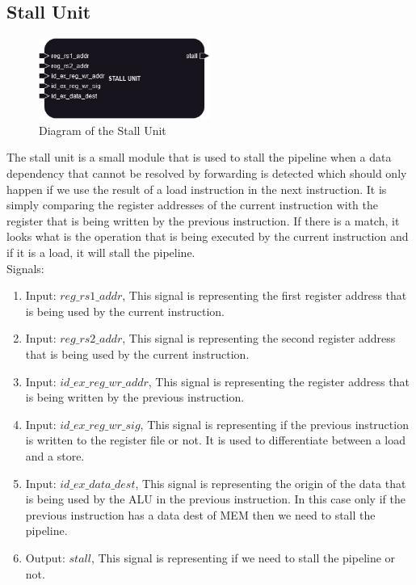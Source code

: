 \subsection{Stall Unit}

\begin{figure}[H]
\centering
\includegraphics[width=0.5\textwidth]{../diagrams/decode/stall_unit.png}
\caption{Diagram of the Stall Unit}
\label{fig:stall_unit}
\end{figure}

The stall unit is a small module that is used to stall the pipeline when a data dependency that cannot be resolved by forwarding is detected
which should only happen if we use the result of a load instruction in the next instruction. It is simply comparing the register addresses of the
current instruction with the register that is being written by the previous instruction. If there is a match, it looks what is the operation that is
being executed by the current instruction and if it is a load, it will stall the pipeline. \\

Signals:
\begin{enumerate}[label={\textbullet}]
    \item Input: $reg\_rs1\_addr$, This signal is representing the first register address that is being used by the current instruction.
    \item Input: $reg\_rs2\_addr$, This signal is representing the second register address that is being used by the current instruction.
    \item Input: $id\_ex\_reg\_wr\_addr$, This signal is representing the register address that is being written by the previous instruction.
    \item Input: $id\_ex\_reg\_wr\_sig$, This signal is representing if the previous instruction is written to the register file or not.
    It is used to differentiate between a load and a store.
    \item Input: $id\_ex\_data\_dest$, This signal is representing the origin of the data that is being used by the ALU in the previous instruction.
    In this case only if the previous instruction has a data dest of MEM then we need to stall the pipeline.
    \item Output: $stall$, This signal is representing if we need to stall the pipeline or not.
\end{enumerate}